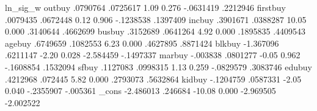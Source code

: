 ln_sig_w      {\VBAR}
       outbuy {\VBAR}   .0790764   .0725617     1.09   0.276    -.0631419    .2212946
     firstbuy {\VBAR}   .0079435   .0672448     0.12   0.906    -.1238538    .1397409
       incbuy {\VBAR}   .3901671   .0388287    10.05   0.000     .3140644    .4662699
       busbuy {\VBAR}   .3152689   .0641264     4.92   0.000     .1895835    .4409543
       agebuy {\VBAR}   .6749659   .1082553     6.23   0.000     .4627895    .8871424
       blkbuy {\VBAR}  -1.367096   .6211147    -2.20   0.028    -2.584459   -.1497337
       marbuy {\VBAR}   -.003838   .0801277    -0.05   0.962    -.1608854    .1532094
        sfbuy {\VBAR}   .1127083   .0998315     1.13   0.259    -.0829579    .3083746
       edubuy {\VBAR}   .4212968    .072445     5.82   0.000     .2793073    .5632864
       kidbuy {\VBAR}  -.1204759   .0587331    -2.05   0.040    -.2355907    -.005361
        _cons {\VBAR}  -2.486013    .246684   -10.08   0.000    -2.969505   -2.002522
